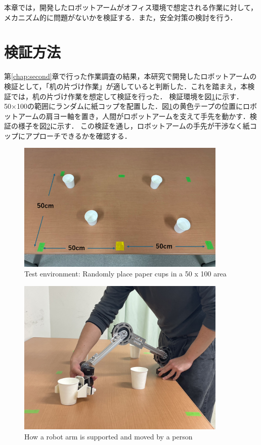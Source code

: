 本章では，開発したロボットアームがオフィス環境で想定される作業に対して，メカニズム的に問題がないかを検証する．また，安全対策の検討を行う．
\section{検証方法}
第\ref{chap:second}章で行った作業調査の結果，本研究で開発したロボットアームの検証として，「机の片づけ作業」が適していると判断した．これを踏まえ，本検証では，机の片づけ作業を想定して検証を行った．
検証環境を図\ref{fig:area}に示す．50×100の範囲にランダムに紙コップを配置した．図\ref{fig:area}の黄色テープの位置にロボットアームの肩ヨー軸を置き，人間がロボットアームを支えて手先を動かす．検証の様子を図\ref{fig:sousa}に示す．
この検証を通し，ロボットアームの手先が干渉なく紙コップにアプローチできるかを確認する．

\begin{figure}
  \centering
  \includegraphics[width=10cm]{images/kensyo/area.png}
  \caption{Test environment: Randomly place paper cups in a 50 x 100 area}
  \label{fig:area}
\end{figure}
\begin{figure}
  \centering
  \includegraphics[width=10cm]{images/kensyo/sousa.jpg}
  \caption{How a robot arm is supported and moved by a person}
  \label{fig:sousa}
\end{figure}
\clearpage
